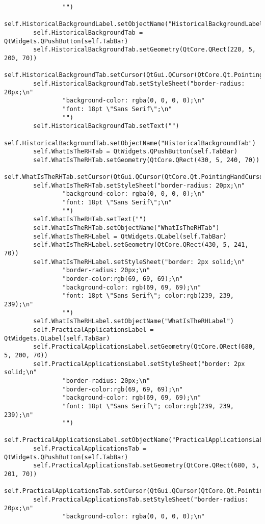\documentclass{article}
\begin{document}
\begin{lstlisting}
                "")
        self.HistoricalBackgroundLabel.setObjectName("HistoricalBackgroundLabel")
        self.HistoricalBackgroundTab = QtWidgets.QPushButton(self.TabBar)
        self.HistoricalBackgroundTab.setGeometry(QtCore.QRect(220, 5, 200, 70))
        self.HistoricalBackgroundTab.setCursor(QtGui.QCursor(QtCore.Qt.PointingHandCursor))
        self.HistoricalBackgroundTab.setStyleSheet("border-radius: 20px;\n"
                "background-color: rgba(0, 0, 0, 0);\n"
                "font: 18pt \"Sans Serif\";\n"
                "")
        self.HistoricalBackgroundTab.setText("")
        self.HistoricalBackgroundTab.setObjectName("HistoricalBackgroundTab")
        self.WhatIsTheRHTab = QtWidgets.QPushButton(self.TabBar)
        self.WhatIsTheRHTab.setGeometry(QtCore.QRect(430, 5, 240, 70))
        self.WhatIsTheRHTab.setCursor(QtGui.QCursor(QtCore.Qt.PointingHandCursor))
        self.WhatIsTheRHTab.setStyleSheet("border-radius: 20px;\n"
                "background-color: rgba(0, 0, 0, 0);\n"
                "font: 18pt \"Sans Serif\";\n"
                "")
        self.WhatIsTheRHTab.setText("")
        self.WhatIsTheRHTab.setObjectName("WhatIsTheRHTab")
        self.WhatIsTheRHLabel = QtWidgets.QLabel(self.TabBar)
        self.WhatIsTheRHLabel.setGeometry(QtCore.QRect(430, 5, 241, 70))
        self.WhatIsTheRHLabel.setStyleSheet("border: 2px solid;\n"
                "border-radius: 20px;\n"
                "border-color:rgb(69, 69, 69);\n"
                "background-color: rgb(69, 69, 69);\n"
                "font: 18pt \"Sans Serif\"; color:rgb(239, 239, 239);\n"
                "")
        self.WhatIsTheRHLabel.setObjectName("WhatIsTheRHLabel")
        self.PracticalApplicationsLabel = QtWidgets.QLabel(self.TabBar)
        self.PracticalApplicationsLabel.setGeometry(QtCore.QRect(680, 5, 200, 70))
        self.PracticalApplicationsLabel.setStyleSheet("border: 2px solid;\n"
                "border-radius: 20px;\n"
                "border-color:rgb(69, 69, 69);\n"
                "background-color: rgb(69, 69, 69);\n"
                "font: 18pt \"Sans Serif\"; color:rgb(239, 239, 239);\n"
                "")
        self.PracticalApplicationsLabel.setObjectName("PracticalApplicationsLabel")
        self.PracticalApplicationsTab = QtWidgets.QPushButton(self.TabBar)
        self.PracticalApplicationsTab.setGeometry(QtCore.QRect(680, 5, 201, 70))
        self.PracticalApplicationsTab.setCursor(QtGui.QCursor(QtCore.Qt.PointingHandCursor))
        self.PracticalApplicationsTab.setStyleSheet("border-radius: 20px;\n"
                "background-color: rgba(0, 0, 0, 0);\n"

\end{lstlisting}
\end{document}
